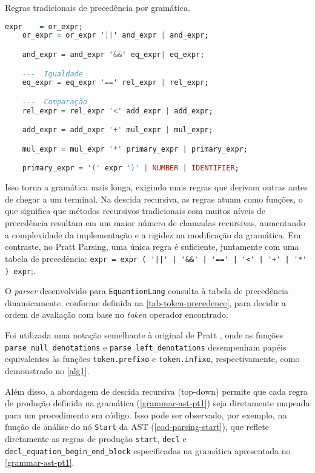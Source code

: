 \begin{codigo}[htb]
    \caption{\small Regras tradicionais de precedência por gramática. }
    \label{cod-regras-tradicionais}
\begin{lstlisting}[language=haskell, numbers=none, inputencoding=utf8]
    expr    = or_expr;
    or_expr = or_expr '||' and_expr | and_expr;

    and_expr = and_expr '&&' eq_expr| eq_expr;

    ---  Igualdade
    eq_expr = eq_expr '==' rel_expr | rel_expr;   

    ---  Comparação
    rel_expr = rel_expr '<' add_expr | add_expr;     

    add_expr = add_expr '+' mul_expr | mul_expr;

    mul_expr = mul_expr '*' primary_expr | primary_expr;

    primary_expr = '(' expr ')' | NUMBER | IDENTIFIER; 
\end{lstlisting}
\end{codigo}

Isso torna a gramática mais longa, exigindo mais regras que derivam outras antes de chegar a um terminal. Na descida recursiva, as regras atuam como funções, o que significa que métodos recursivos tradicionais com muitos níveis de precedência resultam em um maior número de chamadas recursivas, aumentando a complexidade da implementação e a rigidez na modificação da gramática. Em contraste, no Pratt Parsing, uma única regra é suficiente, juntamente com uma tabela de precedência: \verb"expr = expr ( '||' | '&&' | '==' | '<' | '+' | '*' ) expr";.

O \textit{parser} desenvolvido para \texttt{EquantionLang} consulta à tabela de precedência dinamicamente, conforme definida na \autoref{tab-token-precedence}, para decidir a ordem de avaliação com base no \textit{token} operador encontrado.


Foi utilizada uma notação semelhante à original de Pratt \cite{pratt}, onde as funções \verb"parse_null_denotations" e \verb"parse_left_denotations" desempenham papéis equivalentes às funções \texttt{token.prefixo} e \texttt{token.infixo}, respectivamente, como demonstrado no \autoref{alg1}. 

Além disso, a abordagem de descida recursiva (top-down) permite que cada regra de produção definida na gramática (\autoref{grammar-ast-pt1}) seja diretamente mapeada para um procedimento em código. Isso pode ser observado, por exemplo, na função de análise do nó \texttt{Start} da AST (\autoref{cod-parsing-start}), que reflete diretamente as regras de produção \texttt{start}, \texttt{decl} e \verb"decl_equation_begin_end_block" especificadas na gramática apresentada no \autoref{grammar-ast-pt1}.

